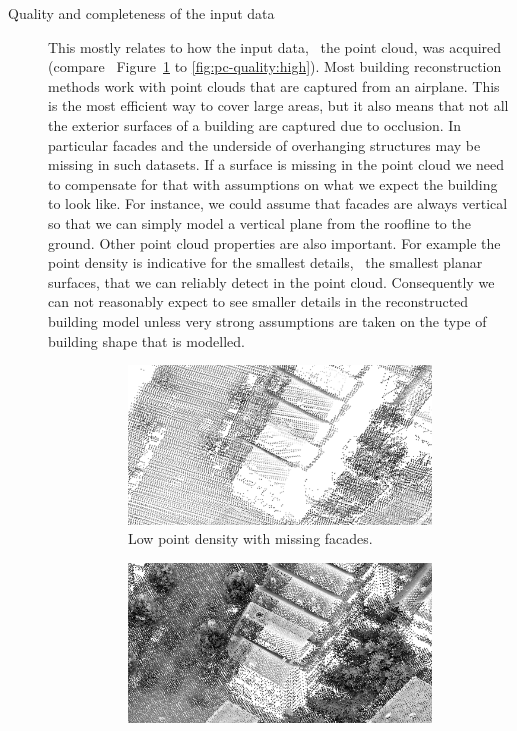 \begin{description}
	\item[Quality and completeness of the input data] This mostly relates to how the input data, \ie\ the point cloud, was acquired (compare \eg\ Figure~\ref{fig:pc-quality:low} to \ref{fig:pc-quality:high}). Most building reconstruction methods work with point clouds that are captured from an airplane. This is the most efficient way to cover large areas, but it also means that not all the exterior surfaces of a building are captured due to occlusion. In particular facades and the underside of overhanging structures may be missing in such datasets. If a surface is missing in the point cloud we need to compensate for that with assumptions on what we expect the building to look like. For instance, we could assume that facades are always vertical so that we can simply model a vertical plane from the roofline to the ground. 
	Other point cloud properties are also important. For example the point density is indicative for the smallest details, \eg\ the smallest planar surfaces, that we can reliably detect in the point cloud. Consequently we can not reasonably expect to see smaller details in the reconstructed building model unless very strong assumptions are taken on the type of building shape that is modelled.
	\begin{figure}
		\centering
		\begin{subfigure}[b]{0.45\linewidth}
			\includegraphics[width=\linewidth]{figs/rdam16_ahn2.png}
			\caption{Low point density with missing facades.}%
			\label{fig:pc-quality:low}
		\end{subfigure}
		\quad
		\begin{subfigure}[b]{0.45\linewidth}
			\includegraphics[width=\linewidth]{figs/rdam16_d.png}

\end{subfigure}
\end{figure}
\end{description}
